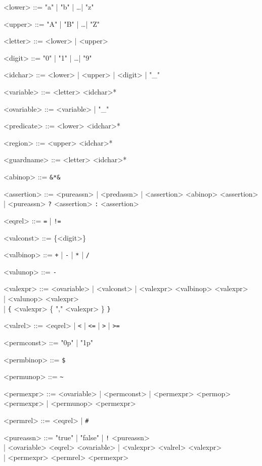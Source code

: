 \documentclass[a4paper]{article}
\begin{document}
\begin{grammar}
  <lower> ::= "a" | "b" | \ldots | "z"

  <upper> ::= "A" | "B" | \ldots | "Z"

  <letter> ::= <lower> | <upper>

  <digit> ::= "0" | "1" | \ldots | "9"

  <idchar> ::= <lower> | <upper> | <digit> | "_"

  <variable> ::= <letter> <idchar>*

  <ovariable> ::= <variable> | "_"

  <predicate> ::= <lower> <idchar>*

  <region> ::= <upper> <idchar>*

  <guardname> ::= <letter> <idchar>*

  <abinop> ::= \verb|&*&|

  <assertion> ::= <pureassn> | <predassn> | <assertion> <abinop> <assertion> \\
              | {\color{blue} <pureassn> \verb|?| <assertion> \verb|:| <assertion>}


  <eqrel> ::= \verb|=| | \verb|!=|

  <valconst> ::= \{<digit>\}

  <valbinop> ::= \verb|+| | \verb|-| | \verb|*| | {\color{blue} \verb|/|}

  <valunop> ::= \verb|-|

  <valexpr> ::= <ovariable> | <valconst> | <valexpr> <valbinop> <valexpr> \\
    | <valunop> <valexpr> \\
    | {\color{blue} \verb|{| <valexpr> \{ "," <valexpr> \} \verb|}| }

  <valrel> ::= <eqrel> | \verb|<| | \verb|<=| | \verb|>| | \verb|>=|

  <permconst> ::= "0p" | "1p"

  <permbinop> ::= \verb|$|

  <permunop> ::= \verb|~|

  <permexpr> ::= <ovariable> | <permconst> | <permexpr> <permop> <permexpr> | <permunop> <permexpr>

  <permrel> ::= <eqrel> | \verb|#|

  <pureassn> ::= "true" | "false" | \verb|!| <pureassn> \\
    | <ovariable> <eqrel> <ovariable>
    | <valexpr> <valrel> <valexpr> \\
    | <permexpr> <permrel> <permexpr>


\end{grammar}
\end{document}
